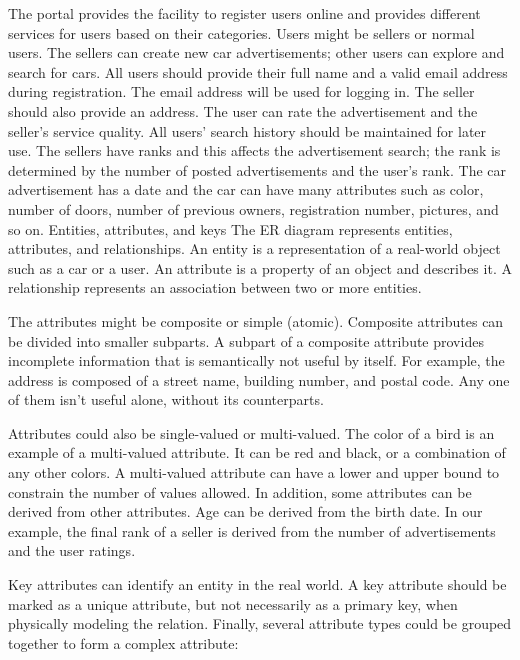 \documentclass[]{book}
\begin{document}
The portal provides the facility to register users online and provides different services for users based on their categories.
Users might be sellers or normal users. The sellers can create new car advertisements; other users can explore and search for cars.
All users should provide their full name and a valid email address during registration. The email address will be used for logging in.
The seller should also provide an address.
The user can rate the advertisement and the seller's service quality.
All users' search history should be maintained for later use.
The sellers have ranks and this affects the advertisement search; the rank is determined by the number of posted advertisements and the user's rank.
The car advertisement has a date and the car can have many attributes such as color, number of doors, number of previous owners, registration number, pictures, and so on.
Entities, attributes, and keys
The ER diagram represents entities, attributes, and relationships. An entity is a representation of a real-world object such as a car or a user. An attribute is a property of an object and describes it. A relationship represents an association between two or more entities.

The attributes might be composite or simple (atomic). Composite attributes can be divided into smaller subparts. A subpart of a composite attribute provides incomplete information that is semantically not useful by itself. For example, the address is composed of a street name, building number, and postal code. Any one of them isn't useful alone, without its counterparts.

Attributes could also be single-valued or multi-valued. The color of a bird is an example of a multi-valued attribute. It can be red and black, or a combination of any other colors. A multi-valued attribute can have a lower and upper bound to constrain the number of values allowed. In addition, some attributes can be derived from other attributes. Age can be derived from the birth date. In our example, the final rank of a seller is derived from the number of advertisements and the user ratings.

Key attributes can identify an entity in the real world. A key attribute should be marked as a unique attribute, but not necessarily as a primary key, when physically modeling the relation. Finally, several attribute types could be grouped together to form a complex attribute:
\end{document}
